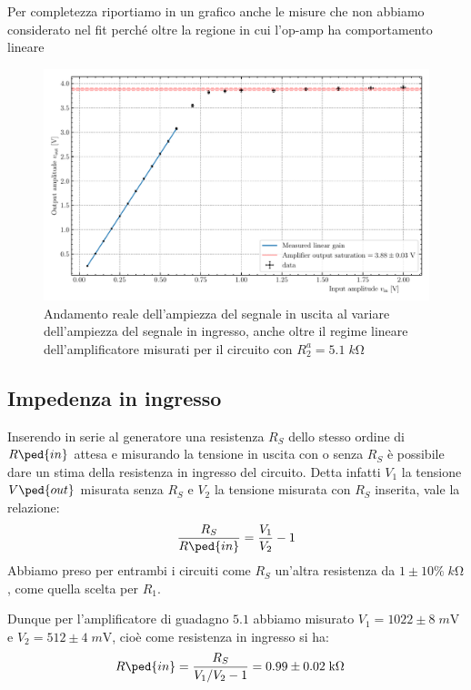 \documentclass[10pt,a4paper]{article}
\begin{document}
Per completezza riportiamo in un grafico anche le misure che non abbiamo
considerato nel fit perché oltre la regione in cui l'op-amp ha comportamento
lineare
\begin{figure}[htbp]
\centering
\includegraphics[scale=0.7]{gainsat}
\caption{Andamento reale dell'ampiezza del segnale in uscita al variare
dell'ampiezza del segnale in ingresso, anche oltre il regime lineare
dell'amplificatore misurati per il circuito con $R_2^a = 5.1 \; \si{k\ohm}$
\label{fig: gainsat}}
\end{figure}

\subsection{Impedenza in ingresso}
Inserendo in serie al generatore una resistenza $R_S$ dello stesso ordine di
$R\ped{in}$ attesa e misurando la tensione in uscita con o senza $R_S$ è
possibile dare un stima della resistenza in ingresso del circuito.
Detta infatti $V_1$ la tensione $V\ped{out}$ misurata senza $R_S$ e $V_2$ la
tensione misurata con $R_S$ inserita, vale la relazione:
\begin{equation}\label{eq: RS}
\frac{R_S}{R\ped{in}} = \frac{V_1}{V_2} - 1
\end{equation}
Abbiamo preso per entrambi i circuiti come $R_S$ un'altra resistenza da
$1 \pm 10\% \; \si{k\ohm}$, come quella scelta per $R_1$.

Dunque per l'amplificatore di guadagno $5.1$ abbiamo misurato
$V_1 = 1022 \pm 8 \; \si{m\V}$ e $V_2 = 512 \pm 4 \; \si{m\V}$, cioè come
resistenza in ingresso si ha:
\begin{align*}
{R\ped{in}} &= \frac{R_S}{V_1/V_2 - 1} = 0.99 \pm 0.02 \; \si{k\ohm}
\end{align*}
\end{document}
